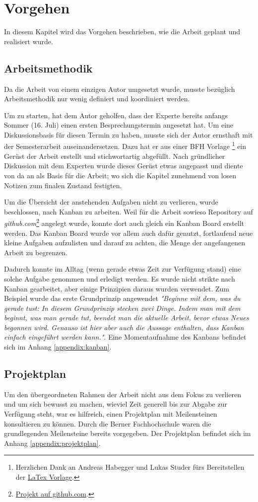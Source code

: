 \section{Vorgehen}
In diesem Kapitel wird das Vorgehen beschrieben, wie die Arbeit geplant und realisiert wurde.

\subsection{Arbeitsmethodik}
Da die Arbeit von einem einzigen Autor umgesetzt wurde, musste bezüglich Arbeitsmethodik nur wenig definiert und koordiniert werden.

Um zu starten, hat dem Autor geholfen, dass der Experte \prof\space bereits anfangs Sommer (16. Juli) einen ersten Besprechungstermin angesetzt hat. Um eine Diskussionsbasis für diesen Termin zu haben, musste sich der Autor ernsthaft mit der Semesterarbeit auseinandersetzen. Dazu hat er aus einer BFH Vorlage \footnote{Herzlichen Dank an Andreas Habegger und Lukas Studer fürs Bereitstellen der \href{https://gitlab.ti.bfh.ch/latex-utils/tpl_latex-thesis}{LaTex Vorlage}.} ein Gerüst der Arbeit erstellt und stichwortartig abgefüllt. Nach gründlicher Diskussion mit dem Experten wurde dieses Gerüst etwas angepasst und diente von da an als Basis für die Arbeit; wo sich die Kapitel zunehmend von losen Notizen zum finalen Zustand festigten.

Um die Übersicht der anstehenden Aufgaben nicht zu verlieren, wurde beschlossen, nach Kanban zu arbeiten. Weil für die Arbeit sowieso Repository auf \emph{github.com}\footnote{\href{https://github.com/bfh-semesterarbeit/spot-geoprocessing/projects/1}{Projekt auf github.com}.} angelegt wurde, konnte dort auch gleich ein Kanban Board erstellt werden. Das Kanban Board wurde vor allem auch dafür genutzt, fortlaufend neue kleine Aufgaben aufzulisten und darauf zu achten, die Menge der angefangenen Arbeit zu begrenzen.

Dadurch konnte im Alltag (wenn gerade etwas Zeit zur Verfügung stand) eine solche Aufgabe genommen und erledigt werden. Es wurde nicht strikte nach Kanban gearbeitet, aber einige Prinzipien daraus wurden verwendet. Zum Beispiel wurde das erste Grundprinzip angewendet \textit{"Beginne mit dem, was du gerade tust:
In diesem Grundprinzip stecken zwei Dinge. Indem man mit dem beginnt, was man gerade tut, beendet man die aktuelle Arbeit, bevor etwas Neues begonnen wird. Genauso ist hier aber auch die Aussage enthalten, dass Kanban einfach eingeführt werden kann."}\cite{kanban2010}. Eine Momentaufnahme des Kanbans befindet sich im Anhang \ref{appendix:kanban}.

\subsection{Projektplan}\label{chap:projektplan}
Um den übergeordneten Rahmen der Arbeit nicht aus dem Fokus zu verlieren und um sich bewusst zu machen, wieviel Zeit generell bis zur Abgabe zur Verfügung steht, war es hilfreich, einen Projektplan mit Meilensteinen konsultieren zu können. Durch die Berner Fachhochschule waren die grundlegenden Meilensteine bereits vorgegeben. Der Projektplan befindet sich im Anhang \ref{appendix:projektplan}.
